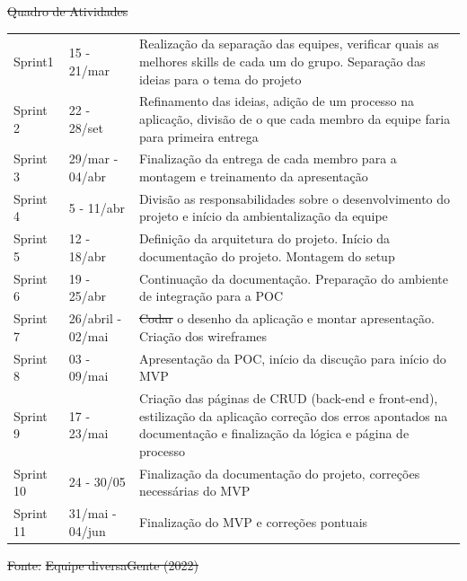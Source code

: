 \documentclass[
    12pt,               %
    openright,          %
    oneside,
    a4paper,            %
    paginasA3,  %
    BIBLATEX,           %
    REFINDENT,          %
    MODELO,             %
    TODO,               %
    english,            %
    brazil              %
    ]{ifsp-spo-inf-ctds} %
\providecommand{\DIFadd}[1]{{\protect\color{blue}\uwave{#1}}} %
\providecommand{\DIFdel}[1]{{\protect\color{red}\sout{#1}}}                      %
\providecommand{\DIFaddbegin}{} %
\providecommand{\DIFaddend}{} %
\providecommand{\DIFdelbegin}{} %
\providecommand{\DIFdelend}{} %
\begin{document}
\begin{quadro}[htb]
	\centering
	\ABNTEXfontereduzida
	\DIFdelbegin %
\DIFdel{Quadro de Atividades}\DIFdelend \DIFaddbegin \caption[Sprints]{\DIFadd{Sprints}\DIFaddend }
	\DIFdelbegin %
\DIFdelend \DIFaddbegin \label{quadro-atividades}
	\DIFaddend \begin{tabular}{|p{1.5cm}|p{3.0cm}|p{10.0cm}|}
		\hline
		\thead{Sprints} & \thead{Período}  & \thead{Atividades} \\
		\hline
		Sprint1 & 15 - 21/mar  & Realização da separação das equipes, verificar quais as melhores skills de cada um do grupo. Separação das ideias para o tema do projeto   \\
		\hline
		Sprint 2 & 22 - 28/set & Refinamento das ideias, adição de um processo na aplicação, divisão de o que cada membro da equipe faria para primeira entrega \\
		\hline
		Sprint 3 & 29/mar - 04/abr  & Finalização da entrega de cada membro para a montagem e treinamento da apresentação \\
		\hline
		Sprint 4 & 5 - 11/abr & Divisão as responsabilidades sobre o desenvolvimento do projeto e início da ambientalização da equipe \\
		\hline
		Sprint 5 & 12 - 18/abr & Definição da arquitetura do projeto. Início da documentação do projeto. Montagem do setup  \\
		\hline
		Sprint 6 & 19 - 25/abr & Continuação da documentação. Preparação do ambiente de integração para a POC \\
		\hline
		Sprint 7 & 26/abril - 02/mai & \DIFdelbegin \DIFdel{Codar }\DIFdelend \DIFaddbegin \DIFadd{Desenvolver }\DIFaddend o desenho da aplicação e montar apresentação. Criação dos wireframes  \\
		\hline
		Sprint 8 & 03 - 09/mai  & Apresentação da POC, início da discução para início do MVP \\
		\hline
		Sprint 9 & 17 - 23/mai  & Criação das páginas de CRUD (back-end e front-end), estilização da aplicação correção dos erros apontados na documentação e finalização da lógica e página de processo  \\
		\hline
		Sprint 10 & 24 - 30/05 & Finalização da documentação do projeto, correções necessárias do MVP \\
		\hline
		Sprint 11 & 31/mai - 04/jun & Finalização do MVP e correções pontuais\\
		\hline
	\end{tabular}
	\DIFdelbegin %
\DIFdel{Fonte:}%
\DIFdel{Equipe diversaGente (2022) }%
\DIFdelend \DIFaddbegin {}
\DIFaddend \end{quadro}
\end{document}
